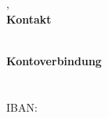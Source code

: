 \footnotesize
\vspace{10mm}
%
\place, \currentDate\\
%
\vspace{10mm}
\scriptsize
\textbf{Kontakt}\\
%
\orgName\\
\address\\
%
\vspace{5mm}
%
%
\vorstand{\personOneName}{\personOneRole}{\personOneEmail}
\vorstand{\personTwoName}{\personTwoRole}{\personTwoEmail}
\ifdefined\personThreeName
    \vorstand{\personThreeName}{\personThreeRole}{\personThreeEmail}
\fi

%
\vspace{10mm}
\textbf{Kontoverbindung}\\
\bankOrgName\\
\bankName\\
IBAN:\\
\iban